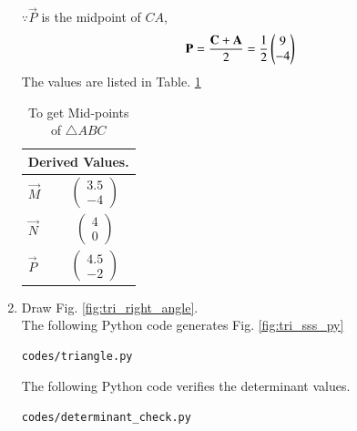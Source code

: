 \begin{enumerate}[label=\thesection.\arabic*.,ref=\thesection.\theenumi]
$\because \vec{P}$ is the midpoint of $CA$,
\begin{align}
\mathbf{P}= \frac{\mathbf{C}+\mathbf{A}}{2} = \frac{1}{2}\begin{pmatrix}9\\-4\end{pmatrix}
\label{eq:constr_p}
\end{align}
%
%
The values are listed in 
Table. \ref{table:table2} 
\begin{table}[ht!]
\centering
\begin{tabular}{ |p{3cm}|p{3cm}|  }
\hline
 \multicolumn{2}{|c|}{Derived Values.} \\
\hline
$\vec{M}$ & $$\begin{pmatrix}3.5\\-4\end{pmatrix}$$\\						
\hline
$\vec{N}$ & $$\begin{pmatrix}4\\0\end{pmatrix} $$\\
\hline
$\vec{P}$ & $$\begin{pmatrix}4.5\\-2\end{pmatrix} $$\\
\hline
\end{tabular}
\caption{To get Mid-points of $\triangle ABC$}
\label{table:table2}
\end{table}
%
\item Draw Fig. \ref{fig:tri_right_angle}.	
\\
\solution The  following Python code generates Fig. \ref{fig:tri_sss_py}
%
\begin{lstlisting}
codes/triangle.py
\end{lstlisting}

The  following Python code verifies the determinant values.

\begin{lstlisting}
codes/determinant_check.py
\end{lstlisting}


\end{enumerate}
